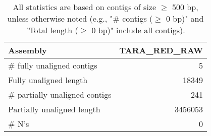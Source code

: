 \documentclass[12pt,a4paper]{article}
\begin{document}
\begin{table}[ht]
\begin{center}
\caption{All statistics are based on contigs of size $\geq$ 500 bp, unless otherwise noted (e.g., "\# contigs ($\geq$ 0 bp)" and "Total length ($\geq$ 0 bp)" include all contigs).}
\begin{tabular}{|l*{1}{|r}|}
\hline
Assembly & TARA\_RED\_RAW \\ \hline
\# fully unaligned contigs & 5 \\ \hline
Fully unaligned length & 18349 \\ \hline
\# partially unaligned contigs & 241 \\ \hline
Partially unaligned length & 3456053 \\ \hline
\# N's & 0 \\ \hline
\end{tabular}
\end{center}
\end{table}
\end{document}
